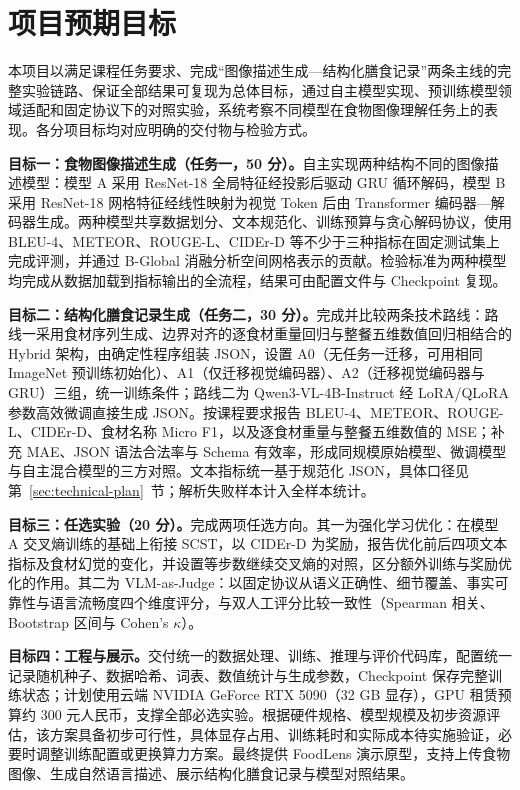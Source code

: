 \section{项目预期目标}
\label{sec:project-goals}
本项目以满足课程任务要求、完成“图像描述生成—结构化膳食记录”两条主线的完整实验链路、保证全部结果可复现为总体目标，通过自主模型实现、预训练模型领域适配和固定协议下的对照实验，系统考察不同模型在食物图像理解任务上的表现。各分项目标均对应明确的交付物与检验方式。

\medskip
\noindent\textbf{目标一：食物图像描述生成（任务一，50 分）。}自主实现两种结构不同的图像描述模型：模型 A 采用 ResNet-18 全局特征经投影后驱动 GRU 循环解码，模型 B 采用 ResNet-18 网格特征经线性映射为视觉 Token 后由 Transformer 编码器—解码器生成。两种模型共享数据划分、文本规范化、训练预算与贪心解码协议，使用 BLEU-4、METEOR、ROUGE-L、CIDEr-D 等不少于三种指标在固定测试集上完成评测，并通过 B-Global 消融分析空间网格表示的贡献。检验标准为两种模型均完成从数据加载到指标输出的全流程，结果可由配置文件与 Checkpoint 复现。

\medskip
\noindent\textbf{目标二：结构化膳食记录生成（任务二，30 分）。}完成并比较两条技术路线：路线一采用食材序列生成、边界对齐的逐食材重量回归与整餐五维数值回归相结合的 Hybrid 架构，由确定性程序组装 JSON，设置 A0（无任务一迁移，可用相同 ImageNet 预训练初始化）、A1（仅迁移视觉编码器）、A2（迁移视觉编码器与 GRU）三组，统一训练条件；路线二为 Qwen3-VL-4B-Instruct 经 LoRA/QLoRA 参数高效微调直接生成 JSON。按课程要求报告 BLEU-4、METEOR、ROUGE-L、CIDEr-D、食材名称 Micro F1，以及逐食材重量与整餐五维数值的 MSE；补充 MAE、JSON 语法合法率与 Schema 有效率，形成同规模原始模型、微调模型与自主混合模型的三方对照。文本指标统一基于规范化 JSON，具体口径见第~\ref{sec:technical-plan}~节；解析失败样本计入全样本统计。

\medskip
\noindent\textbf{目标三：任选实验（20 分）。}完成两项任选方向。其一为强化学习优化：在模型 A 交叉熵训练的基础上衔接 SCST，以 CIDEr-D 为奖励，报告优化前后四项文本指标及食材幻觉的变化，并设置等步数继续交叉熵的对照，区分额外训练与奖励优化的作用。其二为 VLM-as-Judge：以固定协议从语义正确性、细节覆盖、事实可靠性与语言流畅度四个维度评分，与双人工评分比较一致性（Spearman 相关、Bootstrap 区间与 Cohen’s $\kappa$）。

\medskip
\noindent\textbf{目标四：工程与展示。}交付统一的数据处理、训练、推理与评价代码库，配置统一记录随机种子、数据哈希、词表、数值统计与生成参数，Checkpoint 保存完整训练状态；计划使用云端 NVIDIA GeForce RTX 5090（32 GB 显存），GPU 租赁预算约 300 元人民币，支撑全部必选实验。根据硬件规格、模型规模及初步资源评估，该方案具备初步可行性，具体显存占用、训练耗时和实际成本待实施验证，必要时调整训练配置或更换算力方案。最终提供 FoodLens 演示原型，支持上传食物图像、生成自然语言描述、展示结构化膳食记录与模型对照结果。

